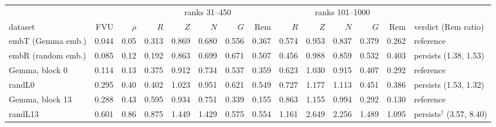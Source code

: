 \begin{tabular}{l rr rrrrr rrrrr l}
\toprule
 & & & \multicolumn{5}{c}{ranks 31--450} & \multicolumn{5}{c}{ranks 101--1000} & \\
\cmidrule(lr){4-8}\cmidrule(lr){9-13}
dataset & FVU & $\rho$ & $R$ & $Z$ & $N$ & $G$ & Rem & $R$ & $Z$ & $N$ & $G$ & Rem & verdict (Rem ratio) \\
\midrule
embT (Gemma emb.) & 0.044 & 0.05 & 0.313 & 0.869 & 0.680 & 0.556 & 0.367 & 0.574 & 0.953 & 0.837 & 0.379 & 0.262 & reference \\
embR (random emb.) & 0.085 & 0.12 & 0.192 & 0.863 & 0.699 & 0.671 & 0.507 & 0.456 & 0.988 & 0.859 & 0.532 & 0.403 & persists (1.38, 1.53) \\ \addlinespace
Gemma, block 0 & 0.114 & 0.13 & 0.375 & 0.912 & 0.734 & 0.537 & 0.359 & 0.623 & 1.030 & 0.915 & 0.407 & 0.292 & reference \\
randL0 & 0.295 & 0.40 & 0.402 & 1.023 & 0.951 & 0.621 & 0.549 & 0.727 & 1.177 & 1.113 & 0.451 & 0.386 & persists (1.53, 1.32) \\ \addlinespace
Gemma, block 13 & 0.288 & 0.43 & 0.595 & 0.934 & 0.751 & 0.339 & 0.155 & 0.863 & 1.155 & 0.994 & 0.292 & 0.130 & reference \\
randL13 & 0.601 & 0.86 & 0.875 & 1.449 & 1.429 & 0.575 & 0.554 & 1.161 & 2.649 & 2.256 & 1.489 & 1.095 & persists$^\dagger$ (3.57, 8.40) \\
\bottomrule
\end{tabular}
